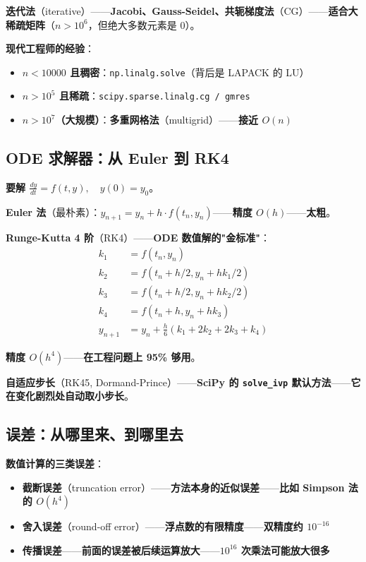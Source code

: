 \textbf{迭代法}（iterative）——\textbf{Jacobi、Gauss-Seidel、共轭梯度法}（CG）——\textbf{适合大稀疏矩阵}（$n > 10^6$，但绝大多数元素是 0）。

\textbf{现代工程师的经验}：

\begin{itemize}
\item \textbf{$n < 10000$ 且稠密}：\texttt{np.linalg.solve}（背后是 LAPACK 的 LU）
\item \textbf{$n > 10^5$ 且稀疏}：\texttt{scipy.sparse.linalg.cg / gmres}
\item \textbf{$n > 10^7$（大规模）}：\textbf{多重网格法}（multigrid）——\textbf{接近 $O(n)$}
\end{itemize}

\subsection{ODE 求解器：从 Euler 到 RK4}

\textbf{要解 $\frac{dy}{dt} = f(t, y), \quad y(0) = y_0$}。

\textbf{Euler 法}（最朴素）：$y_{n+1} = y_n + h \cdot f(t_n, y_n)$——\textbf{精度 $O(h)$}——\textbf{太粗}。

\textbf{Runge-Kutta 4 阶}（RK4）——\textbf{ODE 数值解的"金标准"}：
\begin{align}
k_1 &= f(t_n, y_n) \\
k_2 &= f(t_n + h/2, y_n + h k_1/2) \\
k_3 &= f(t_n + h/2, y_n + h k_2/2) \\
k_4 &= f(t_n + h, y_n + h k_3) \\
y_{n+1} &= y_n + \frac{h}{6} (k_1 + 2k_2 + 2k_3 + k_4)
\end{align}

\textbf{精度 $O(h^4)$}——\textbf{在工程问题上 95\% 够用}。

\textbf{自适应步长}（RK45, Dormand-Prince）——\textbf{SciPy 的 \texttt{solve\_ivp} 默认方法}——\textbf{它在变化剧烈处自动取小步长}。

\subsection{误差：从哪里来、到哪里去}

\textbf{数值计算的三类误差}：

\begin{itemize}
\item \textbf{截断误差}（truncation error）——\textbf{方法本身的近似误差}——\textbf{比如 Simpson 法的 $O(h^4)$}
\item \textbf{舍入误差}（round-off error）——\textbf{浮点数的有限精度}——\textbf{双精度约 $10^{-16}$}
\item \textbf{传播误差}——\textbf{前面的误差被后续运算放大}——\textbf{$10^{16}$ 次乘法可能放大很多}
\end{itemize}


